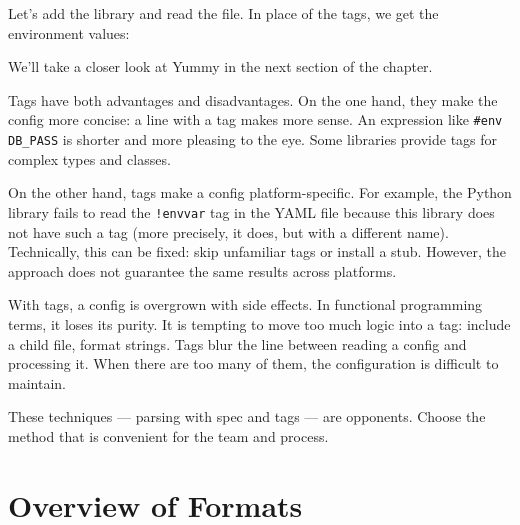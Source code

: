 Let's add the library and read the file. In place of the tags, we get the environment values:

\ifnarrow

\begin{clojure}
(require '[yummy.config :as yummy])

(yummy/load-config
  {:path "config.yaml"})

{:server_port 8080
 :db {:dbtype "mysql"
      :dbname "book"
      :user "ivan"
      :password "*(&fd}A53z#$!"}}
\end{clojure}

\else

\begin{clojure}
(require '[yummy.config :as yummy])

(yummy/load-config {:path "config.yaml"})

{:server_port 8080
 :db {:dbtype "mysql"
      :dbname "book"
      :user "ivan"
      :password "*(&fd}A53z#$!"}}
\end{clojure}

\fi

\noindent
We'll take a closer look at Yummy in the next section of the chapter.

Tags have both advantages and disadvantages. On the one hand, they make the config more concise: a line with a tag makes more sense. An expression like \verb|#env DB_PASS| is shorter and more pleasing to the eye. Some libraries provide tags for complex types and classes.

On the other hand, tags make a config platform-specific. For example, the Python library fails to read the \verb|!envvar| tag in the YAML file because this library does not have such a tag (more precisely, it does, but with a different name). Technically, this can be fixed: skip unfamiliar tags or install a stub. However, the approach does not guarantee the same results across platforms.

With tags, a config is overgrown with side effects. In functional programming terms, it loses its purity. It is tempting to move too much logic into a tag: include a child file, format strings. Tags blur the line between reading a config and processing it. When there are too many of them, the configuration is difficult to maintain.

These techniques — parsing with spec and tags — are opponents. Choose the method that is convenient for the team and process.

\section{Overview of Formats}

